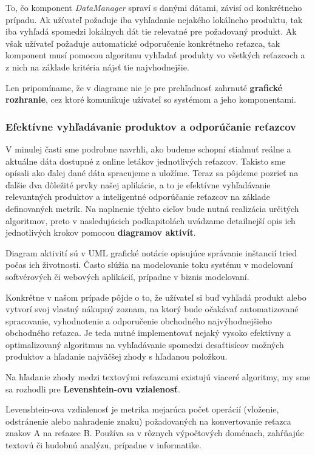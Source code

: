 \documentclass[twoside,slovak, a4paper]{article}
\begin{document}
To, čo komponent \textit{DataManager} spraví s danými dátami, závisí od konkrétneho prípadu. Ak užívateľ požaduje iba vyhľadanie nejakého lokálneho produktu, tak iba vyhľadá spomedzi lokálnych dát tie relevatné pre požadovaný produkt. Ak však užívateľ požaduje automatické odporučenie konkrétneho reťazca, tak komponent musí pomocou algoritmu vyhľadať produkty vo všetkých reťazcoch a z nich na základe kritéria nájsť tie najvhodnejšie.

Len pripomíname, že v diagrame nie je pre prehľadnosť zahrnuté \textbf{grafické rozhranie}, cez ktoré komunikuje užívateľ so systémom a jeho komponentami.

\subsubsection{Efektívne vyhľadávanie produktov a odporúčanie reťazcov}

V minulej časti sme podrobne navrhli, ako budeme schopní stiahnuť reálne a aktuálne dáta dostupné z online letákov jednotlivých reťazcov. Takisto sme opísali ako ďalej dané dáta spracujeme a uložíme. Teraz sa pôjdeme pozrieť na ďalšie dva dôležité prvky našej aplikácie, a to je efektívne vyhľadávanie relevantných produktov a inteligentné odporúčanie reťazcov na základe definovaných metrík. Na naplnenie týchto cieľov bude nutná realizácia určitých algoritmov, preto v nasledujúcich podkapitolách uvádzame detailnejší opis ich jednotlivých krokov pomocou \textbf{diagramov aktivít}. 

Diagram aktivití sú v UML grafické notácie opisujúce správanie inštancií tried počas ich životnosti. Často slúžia na modelovanie toku systému v modelovaní softvérových či webových aplikácií, prípadne v biznis modelovaní.\cite{ABBAS2021101911}


Konkrétne v našom prípade  pôjde o to, že užívateľ si buď vyhľadá produkt alebo vytvorí svoj vlastný nákupný zoznam, na ktorý bude očakávať automatizované spracovanie, vyhodnotenie a odporučenie obchodného najvýhodnejšieho obchodného reťazca. Je teda nutné implementovať nejaký vysoko efektívny a optimalizovaný algoritmus na vyhľadávanie spomedzi desaťtisícov možných produktov a hľadanie najväčšej zhody s hľadanou položkou.

Na hľadanie zhody medzi textovými reťazcami existujú viaceré algoritmy, my sme sa rozhodli pre \textbf{Levenshtein-ovu vzialenosť}.

Levenshtein-ova vzdialenosť je metrika mejarúca počet operácií (vloženie, odstránenie alebo nahradenie znaku) požadovaných na konvertovanie reťazca znakov A na reťazec B. Používa sa v rôznych výpočtových doménach, zahŕňajúc textovú či hudobnú analýzu, prípadne v informatike.\cite{CASTELLSRUFAS2023103019}
\end{document}
